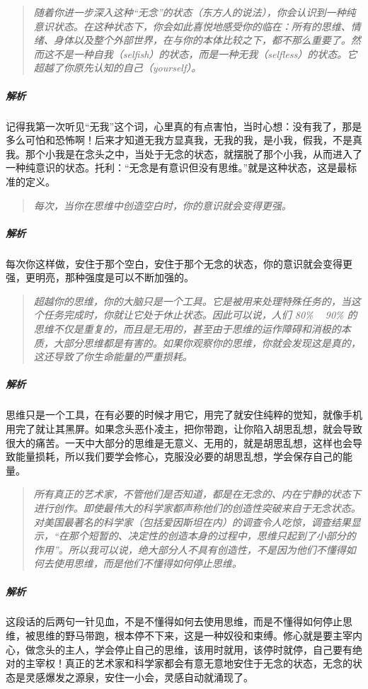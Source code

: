 \begin{quote}\it
    随着你进一步深入这种“无念”的状态（东方人的说法），你会认识到一种纯意识状态。在这种状态下，你会如此喜悦地感受你的临在：所有的思维、情绪、身体以及整个外部世界，在与你的本体比较之下，都不那么重要了。然而这不是一种自我（selfish）的状态，而是一种无我（selfless）的状态。它超越了你原先认知的自己（yourself）。
\end{quote}

\subparagraph{解析} 记得我第一次听见“无我”这个词，心里真的有点害怕，当时心想：没有我了，那是多么可怕和恐怖啊！后来才知道无我方显真我，无我的我，是小我，假我，不是真我。那个小我是在念头之中，当处于无念的状态，就摆脱了那个小我，从而进入了一种纯意识的状态。托利：“无念是有意识但没有思维。”就是这种状态，这是最标准的定义。

\begin{quote}\it
    每次，当你在思维中创造空白时，你的意识就会变得更强。
\end{quote}

\subparagraph{解析} 每次你这样做，安住于那个空白，安住于那个无念的状态，你的意识就会变得更强，更明亮，那种强度是可以不断加强的。

\begin{quote}\it
    超越你的思维，你的大脑只是一个工具。它是被用来处理特殊任务的，当这个任务完成时，你就让它处于休止状态。因此可以说，人们 80\% ~ 90\% 的思维不仅是重复的，而且是无用的，甚至由于思维的运作障碍和消极的本质，大部分思维都是有害的。如果你观察你的思维，你就会发现这是真的，这还导致了你生命能量的严重损耗。
\end{quote}

\subparagraph{解析} 思维只是一个工具，在有必要的时候才用它，用完了就安住纯粹的觉知，就像手机用完了就让其黑屏。如果念头恶仆凌主，把你带跑，让你陷入胡思乱想，就会导致很大的痛苦。一天中大部分的思维是无意义、无用的，就是胡思乱想，这样也会导致能量损耗，所以我们要学会修心，克服没必要的胡思乱想，学会保存自己的能量。

\begin{quote}\it
    所有真正的艺术家，不管他们是否知道，都是在无念的、内在宁静的状态下进行创作。即使最伟大的科学家都声称他们的创造性突破来自于无念状态。对美国最著名的科学家（包括爱因斯坦在内）的调查令人吃惊，调查结果显示，“在那个短暂的、决定性的创造本身的过程中，思维只起到了小部分的作用”。所以我可以说，绝大部分人不具有创造性，不是因为他们不懂得如何去使用思维，而是他们不懂得如何停止思维。
\end{quote}

\subparagraph{解析} 这段话的后两句一针见血，不是不懂得如何去使用思维，而是不懂得如何停止思维，被思维的野马带跑，根本停不下来，这是一种奴役和束缚。修心就是要主宰内心，做念头的主人，学会停止自己的思维，该用时就用，该停时就停，自己要有绝对的主宰权！真正的艺术家和科学家都会有意无意地安住于无念的状态，无念的状态是灵感爆发之源泉，安住一小会，灵感自动就涌现了。


